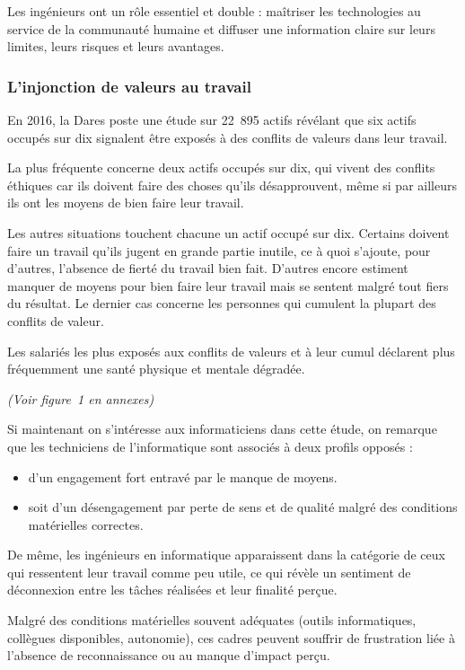 \documentclass[12pt,a4paper]{report}
\begin{document}
Les ingénieurs ont un rôle essentiel et double : maîtriser les technologies au service de la communauté humaine et diffuser une information claire sur leurs limites, leurs risques et leurs avantages.

\subsubsection{L'injonction de valeurs au travail}

En 2016, la Dares poste une étude sur 22~895 actifs révélant que six actifs occupés sur dix signalent être exposés à des conflits de valeurs dans leur travail.

La plus fréquente concerne deux actifs occupés sur dix, qui vivent des conflits éthiques car ils doivent faire des choses qu'ils désapprouvent, même si par ailleurs ils ont les moyens de bien faire leur travail.

Les autres situations touchent chacune un actif occupé sur dix. Certains doivent faire un travail qu'ils jugent en grande partie inutile, ce à quoi s'ajoute, pour d'autres, l'absence de fierté du travail bien fait. D'autres encore estiment manquer de moyens pour bien faire leur travail mais se sentent malgré tout fiers du résultat. Le dernier cas concerne les personnes qui cumulent la plupart des conflits de valeur.

Les salariés les plus exposés aux conflits de valeurs et à leur cumul déclarent plus fréquemment une santé physique et mentale dégradée.

\begin{center}
\textit{(Voir figure~1 en annexes)}
\end{center}

Si maintenant on s'intéresse aux informaticiens dans cette étude, on remarque que les techniciens de l'informatique sont associés à deux profils opposés :
\begin{itemize}
    \item d'un engagement fort entravé par le manque de moyens.
    \item soit d'un désengagement par perte de sens et de qualité malgré des conditions matérielles correctes.
\end{itemize}

De même, les ingénieurs en informatique apparaissent dans la catégorie de ceux qui ressentent leur travail comme peu utile, ce qui révèle un sentiment de déconnexion entre les tâches réalisées et leur finalité perçue.

Malgré des conditions matérielles souvent adéquates (outils informatiques, collègues disponibles, autonomie), ces cadres peuvent souffrir de frustration liée à l'absence de reconnaissance ou au manque d'impact perçu.
\end{document}

